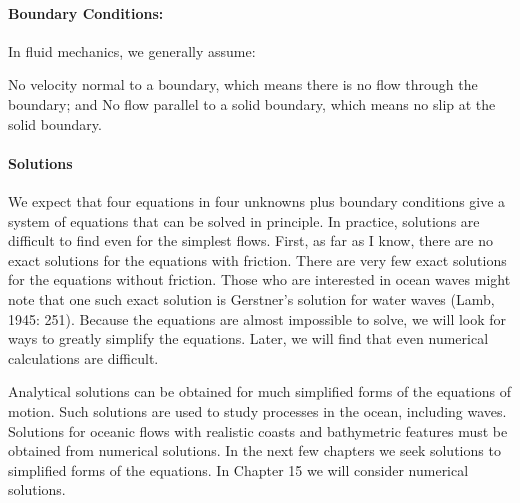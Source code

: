 \paragraph{Boundary Conditions:}
In fluid mechanics, we generally assume:
\begin{enumerate}
\vitem No velocity normal to a boundary, which means there is no flow through the
boundary; and
\vitem No flow parallel to a solid boundary, which means no slip at the solid
boundary.
\end{enumerate}

\paragraph{Solutions}
We expect that four equations in four unknowns plus boundary conditions give a
system of equations that can be solved in principle. In practice, solutions are
difficult to find even for the simplest flows. First, as far as I know, there
are no exact solutions for the equations with friction. There are very few exact
solutions for the equations without friction. Those who are interested in ocean
waves might note that one such exact solution is Gerstner's solution for water
waves (Lamb, 1945: 251). Because the equations are almost impossible to solve, we
will look for ways to greatly simplify the equations. Later, we will find
that even numerical calculations are difficult.

Analytical solutions can be obtained for much simplified forms of the equations
of motion. Such solutions are used to study processes in the ocean, including
waves. Solutions for oceanic flows with realistic coasts and bathymetric
features must be obtained from numerical solutions. In the next few
chapters we seek solutions to simplified forms of the equations. In Chapter 15 we
will consider numerical solutions.

